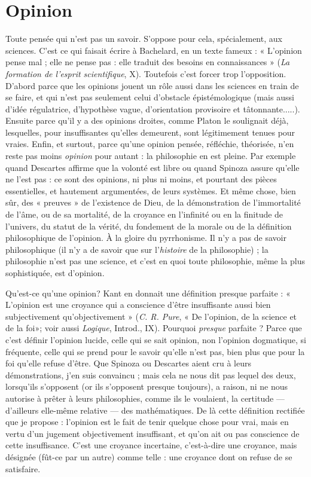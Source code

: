\section{Opinion}
Toute pensée qui n’est pas un savoir. S’oppose pour cela, spécialement,
aux sciences. C’est ce qui faisait écrire à Bachelard, en un
texte fameux : « L'opinion pense mal ; elle ne pense pas : elle traduit des besoins
en connaissances » ({\it La formation de l'esprit scientifique}, X). Toutefois c’est forcer
trop l’opposition. D'abord parce que les opinions jouent un rôle aussi dans les
sciences en train de se faire, et qui n’est pas seulement celui d’obstacle épistémologique
(mais aussi d’idée régulatrice, d’hypothèse vague, d’orientation provisoire
et tâtonnante.....). Ensuite parce qu’il y a des opinions droites, comme
Platon le soulignait déjà, lesquelles, pour insuffisantes qu’elles demeurent, sont
légitimement tenues pour vraies. Enfin, et surtout, parce qu’une opinion
pensée, réfléchie, théorisée, n’en reste pas moins {\it opinion} pour autant : la philosophie
en est pleine. Par exemple quand Descartes affirme que la volonté est
libre ou quand Spinoza assure qu’elle ne l’est pas : ce sont des opinions, ni plus
ni moins, et pourtant des pièces essentielles, et hautement argumentées, de
leurs systèmes. Et même chose, bien sûr, des « preuves » de l’existence de Dieu,
de la démonstration de l’immortalité de l’âme, ou de sa mortalité, de la
croyance en l’infinité ou en la finitude de l’univers, du statut de la vérité, du
fondement de la morale ou de la définition philosophique de l'opinion. À la
gloire du pyrrhonisme. Il n’y a pas de savoir philosophique (il n’y a de savoir
que sur l’{\it histoire} de la philosophie) ; la philosophie n’est pas une science, et
c’est en quoi toute philosophie, même la plus sophistiquée, est d'opinion.

Qu'est-ce qu’une opinion? Kant en donnait une définition presque
parfaite : « L'opinion est une croyance qui a conscience d’être insuffisante aussi
bien subjectivement qu’objectivement » ({\it C. R. Pure}, « De l'opinion, de la
science et de la foi»; voir aussi {\it Logique}, Introd., IX). Pourquoi {\it presque}
parfaite ? Parce que c’est définir l’opinion lucide, celle qui se sait opinion, non
l'opinion dogmatique, si fréquente, celle qui se prend pour le savoir qu’elle
n'est pas, bien plus que pour la foi qu’elle refuse d’être. Que Spinoza ou Descartes
aient cru à leurs démonstrations, j’en suis convaincu ; mais cela ne nous
dit pas lequel des deux, lorsqu'ils s'opposent (or ils s'opposent presque toujours),
a raison, ni ne nous autorise à prêter à leurs philosophies, comme ils le
voulaient, la certitude — d’ailleurs elle-même relative — des mathématiques. De
là cette définition rectifiée que je propose : l’opinion est le fait de tenir quelque
chose pour vrai, mais en vertu d’un jugement objectivement insuffisant, et
qu’on ait ou pas conscience de cette insuffisance. C’est une croyance incertaine,
c’est-à-dire une croyance, mais désignée (fût-ce par un autre) comme telle : une
croyance dont on refuse de se satisfaire.

